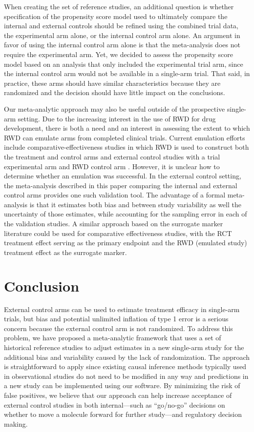 \documentclass[11pt,final,fleqn]{article}\usepackage[]{graphicx}\usepackage[]{color}
\begin{document}
When creating the set of reference studies, an additional question is whether specification of the propensity score model used to ultimately compare the internal and external controls should be refined using the combined trial data, the experimental arm alone, or the internal control arm alone. An argument in favor of using the internal control arm alone is that the meta-analysis does not require the experimental arm. Yet, we decided to assess the propensity score model based on an analysis that only included the experimental trial arm, since the internal control arm would not be available in a single-arm trial. That said, in practice, these arms should have similar characteristics because they are randomized and the decision should have little impact on the conclusions. 

Our meta-analytic approach may also be useful outside of the prospective single-arm setting. Due to the increasing interest in the use of RWD for drug development, there is both a need and an interest in assessing the extent to which RWD can emulate arms from completed clinical trials. Current emulation efforts include comparative-effectiveness studies \cite{franklin2021emulating} in which RWD is used to construct both the treatment and control arms and external control studies with a trial experimental arm and RWD control arm \cite{carrigan2020using}. However, it is unclear how to determine whether an emulation was successful. In the external control setting, the meta-analysis described in this paper comparing the internal and external control arms provides one such validation tool. The advantage of a formal meta-analysis is that it estimates both bias and between study variability as well the uncertainty of those estimates, while accounting for the sampling error in each of the validation studies. A similar approach based on the surrogate marker literature could be used for comparative effectiveness studies, with the RCT treatment effect serving as the primary endpoint and the RWD (emulated study) treatment effect as the surrogate marker.

\section{Conclusion} \label{sec:conclusion}
External control arms can be used to estimate treatment efficacy in single-arm trials, but bias and potential unlimited inflation of type 1 error is a serious concern because the external control arm is not randomized. To address this problem, we have proposed a meta-analytic framework that uses a set of historical reference studies to adjust estimates in a new single-arm study for the additional bias and variability caused by the lack of randomization. The approach is straightforward to apply since existing causal inference methods typically used in observational studies do not need to be modified in any way and predictions in a new study can be implemented using our software. By minimizing the risk of false positives, we believe that our approach can help increase acceptance of external control studies in both internal---such as ``go/no-go'' decisions on whether to move a molecule forward for further study---and regulatory decision making.
\end{document}
